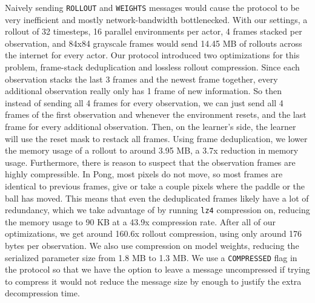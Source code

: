 \documentclass{article}
\begin{document}
Naively sending \verb|ROLLOUT| and \verb|WEIGHTS| messages would cause the protocol to be very inefficient and mostly
network-bandwidth bottlenecked. With our settings, a rollout of 32 timesteps, 16 parallel environments per actor,
4 frames stacked per observation, and 84x84 grayscale frames would send 14.45 MB of rollouts across the internet
for every actor. Our protocol introduced two optimizations for this problem, frame-stack deduplication and lossless
rollout compression. Since each observation stacks the last 3 frames and the newest frame together, every
additional observation really only has 1 frame of new information. So then instead of sending all 4 frames for every observation,
we can just send all 4 frames of the first observation and whenever the environment resets, and the last frame for every
additional observation. Then, on the learner's side, the learner will use the reset mask to restack all frames. Using frame
deduplication, we lower the memory usage of a rollout to around 3.95 MB, a 3.7x reduction in memory usage. Furthermore,
there is reason to suspect that the observation frames are highly compressible. In Pong, most pixels do not move, so most frames
are identical to previous frames, give or take a couple pixels where the paddle or the ball has moved. This means that even the
deduplicated frames likely have a lot of redundancy, which we take advantage of by running \verb|lz4| compression on, reducing the
memory usage to 90 KB at a 43.9x compression rate. After all of our optimizations, we get around 160.6x rollout compression,
using only around 176 bytes per observation. We also use compression on model weights, reducing the serialized parameter size from
1.8 MB to 1.3 MB. We use a \verb|COMPRESSED| flag in the protocol so that we have the option to leave a message uncompressed if
trying to compress it would not reduce the message size by enough to justify the extra decompression time.
\end{document}
